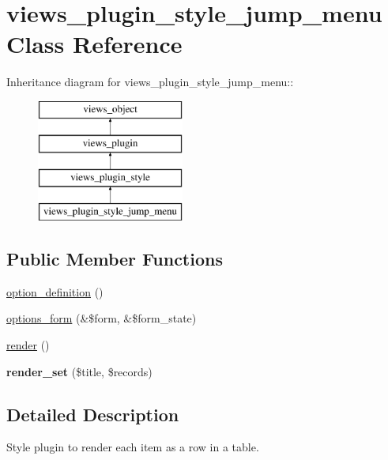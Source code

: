 \hypertarget{classviews__plugin__style__jump__menu}{
\section{views\_\-plugin\_\-style\_\-jump\_\-menu Class Reference}
\label{classviews__plugin__style__jump__menu}
}
Inheritance diagram for views\_\-plugin\_\-style\_\-jump\_\-menu::\begin{figure}[H]
\begin{center}
\leavevmode
\includegraphics[height=4cm]{classviews__plugin__style__jump__menu}
\end{center}
\end{figure}
\subsection*{Public Member Functions}
\begin{CompactItemize}
\item 
\hyperlink{classviews__plugin__style__jump__menu_6e27e595ed6a3115705f13b76367b637}{option\_\-definition} ()
\item 
\hyperlink{classviews__plugin__style__jump__menu_d7158f1d70c97809b44bfa0e10b11709}{options\_\-form} (\&\$form, \&\$form\_\-state)
\item 
\hyperlink{classviews__plugin__style__jump__menu_ebc54d57acea582a05435beccaa26fef}{render} ()
\item 
\hypertarget{classviews__plugin__style__jump__menu_93441f167ef28ec39b09930713878d4a}{
\textbf{render\_\-set} (\$title, \$records)}
\label{classviews__plugin__style__jump__menu_93441f167ef28ec39b09930713878d4a}

\end{CompactItemize}


\subsection{Detailed Description}
Style plugin to render each item as a row in a table. 

